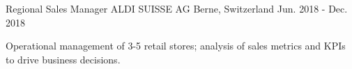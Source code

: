 \begin{cventries}
  \cventry
    {Regional Sales Manager} %
    {ALDI SUISSE AG} %
    {Berne, Switzerland} %
    {Jun. 2018 - Dec. 2018} %
    {
      \begin{cvitems} %
        \item {Operational management of 3-5 retail stores; analysis of sales metrics and KPIs to drive business decisions.}
      \end{cvitems}
    }

\end{cventries}
